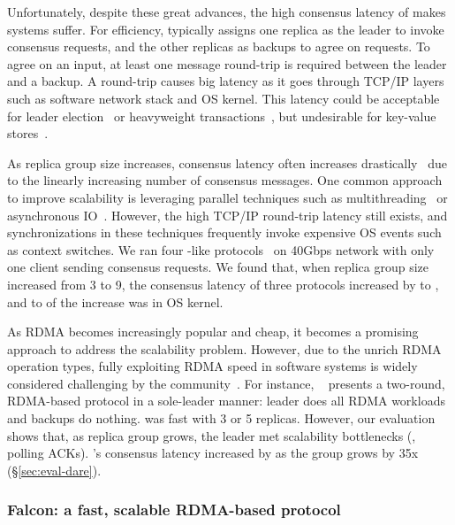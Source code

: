 Unfortunately, despite these great advances, the high consensus latency of 
\paxos makes systems suffer. For efficiency, \paxos typically assigns one 
replica as the leader to invoke consensus requests, and the other replicas as 
backups to agree on requests. To agree on an input, at least one message 
round-trip is required between the leader and a backup. A round-trip causes big 
latency as it goes through TCP/IP layers such as software network stack and OS 
kernel. This latency could be acceptable for leader 
election~\cite{chubby:osdi,zookeeper} or
heavyweight transactions~\cite{crane:sosp15,eve:osdi12}, but undesirable for
key-value stores~\cite{redis,memcached}.

As replica group size increases, \paxos consensus latency often increases
drastically~\cite{scatter:sosp11} due to the linearly increasing number of 
consensus messages. One common approach to improve \paxos scalability is 
leveraging parallel techniques such as multithreading~\cite{zookeeper, 
spaxos:srds12} or asynchronous IO~\cite{crane:sosp15, libpaxos}. However, the 
high TCP/IP round-trip latency still exists, and synchronizations in these 
techniques frequently invoke expensive OS events such as context switches. We 
ran four \paxos-like protocols~\cite{zookeeper, spaxos:srds12, crane:sosp15, 
libpaxos} on 40Gbps network with only one client sending consensus requests. We 
found that, when replica group size increased from 3 to 9, the consensus 
latency of three protocols increased by \tradlatencyincreaselow to 
\tradlatencyincreasehigh, and \systemcostlow to \systemcosthigh of the increase 
was in OS kernel.

As RDMA becomes increasingly popular and cheap, it becomes a promising approach 
to address the \paxos scalability problem. However, due to the unrich RDMA 
operation types, fully exploiting RDMA speed in software systems is widely 
considered challenging by the community~\cite{pilaf:usenix14,herd:sigcomm14,
farm:sosp15,dare:hpdc15}. For instance, \dare~\cite{dare:hpdc15} presents a
two-round, RDMA-based \paxos protocol in a sole-leader manner: leader does all 
RDMA workloads and backups do nothing. \dare was fast with 3 or 5 
replicas. However, our evaluation shows that, as replica group grows, the 
leader met scalability bottlenecks (\eg, polling ACKs). \dare's consensus 
latency increased by \darescalability as the group grows by 35x
(\S\ref{sec:eval-dare}).

\vspace{-.15in}\subsubsection{Falcon: a fast, scalable RDMA-based \paxos 
protocol} 
\label{sec:falcon}\vspace{-.075in}

